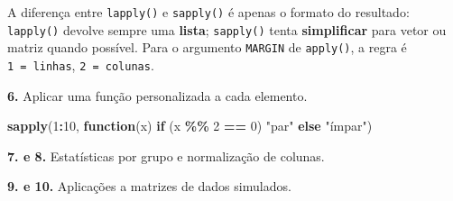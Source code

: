 \documentclass[
  portuguese,
  11pt,
  openany]{book}
\newenvironment{Shaded}{\begin{snugshade}}{\end{snugshade}}
\newcommand{\ControlFlowTok}[1]{\textcolor[rgb]{0.13,0.29,0.53}{\textbf{#1}}}
\newcommand{\DecValTok}[1]{\textcolor[rgb]{0.00,0.00,0.81}{#1}}
\newcommand{\FunctionTok}[1]{\textcolor[rgb]{0.13,0.29,0.53}{\textbf{#1}}}
\newcommand{\NormalTok}[1]{#1}
\newcommand{\OtherTok}[1]{\textcolor[rgb]{0.56,0.35,0.01}{#1}}
\newcommand{\SpecialCharTok}[1]{\textcolor[rgb]{0.81,0.36,0.00}{\textbf{#1}}}
\newcommand{\StringTok}[1]{\textcolor[rgb]{0.31,0.60,0.02}{#1}}
\begin{document}
A diferença entre \texttt{lapply()} e \texttt{sapply()} é apenas o formato do resultado:
\texttt{lapply()} devolve sempre uma \textbf{lista}; \texttt{sapply()} tenta \textbf{simplificar} para
vetor ou matriz quando possível. Para o argumento \texttt{MARGIN} de \texttt{apply()}, a regra
é \texttt{1\ =\ linhas}, \texttt{2\ =\ colunas}.

\textbf{6.} Aplicar uma função personalizada a cada elemento.

\begin{Shaded}
\begin{Highlighting}[]
\FunctionTok{sapply}\NormalTok{(}\DecValTok{1}\SpecialCharTok{:}\DecValTok{10}\NormalTok{, }\ControlFlowTok{function}\NormalTok{(x) }\ControlFlowTok{if}\NormalTok{ (x }\SpecialCharTok{\%\%} \DecValTok{2} \SpecialCharTok{==} \DecValTok{0}\NormalTok{) }\StringTok{"par"} \ControlFlowTok{else} \StringTok{"ímpar"}\NormalTok{)}
\end{Highlighting}
\end{Shaded}

\textbf{7. e 8.} Estatísticas por grupo e normalização de colunas.

\begin{Shaded}
\end{Shaded}

\textbf{9. e 10.} Aplicações a matrizes de dados simulados.
\end{document}
